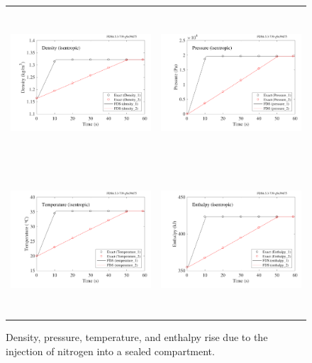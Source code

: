 \documentclass[11pt]{book}
\begin{document}
\begin{figure}[ht]
\begin{tabular*}{\textwidth}{lr}
\includegraphics[height=2.2in]{SCRIPT_FIGURES/isentropic_density} &
\includegraphics[height=2.2in]{SCRIPT_FIGURES/isentropic_pressure} \\
\includegraphics[height=2.2in]{SCRIPT_FIGURES/isentropic_temperature} &
\includegraphics[height=2.2in]{SCRIPT_FIGURES/isentropic_enthalpy}
\end{tabular*}
\caption[The  test case]{Density, pressure, temperature, and enthalpy rise due to the injection of nitrogen into a sealed compartment.}
\label{isentropic_fig}
\end{figure}
\end{document}

